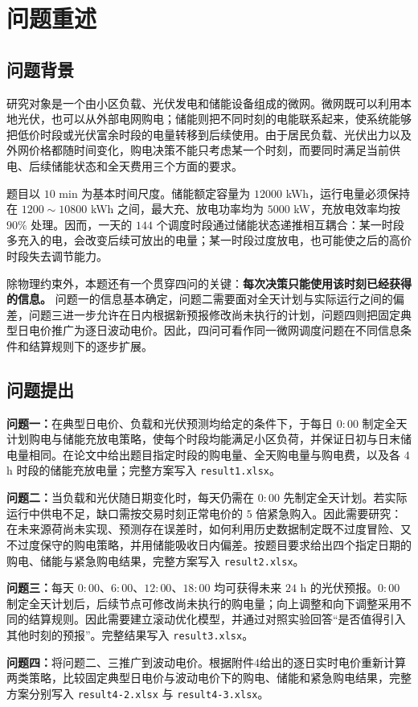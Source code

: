 \section{问题重述}

\subsection{问题背景}

研究对象是一个由小区负载、光伏发电和储能设备组成的微网。微网既可以利用本地光伏，也可以从外部电网购电；储能则把不同时刻的电能联系起来，使系统能够把低价时段或光伏富余时段的电量转移到后续使用。由于居民负载、光伏出力以及外网价格都随时间变化，购电决策不能只考虑某一个时刻，而要同时满足当前供电、后续储能状态和全天费用三个方面的要求。

题目以 $10$ min 为基本时间尺度。储能额定容量为 $12000$ kWh，运行电量必须保持在 $1200\sim10800$ kWh 之间，最大充、放电功率均为 $5000$ kW，充放电效率均按 $90\%$ 处理。因而，一天的 $144$ 个调度时段通过储能状态递推相互耦合：某一时段多充入的电，会改变后续可放出的电量；某一时段过度放电，也可能使之后的高价时段失去调节能力。

除物理约束外，本题还有一个贯穿四问的关键：\textbf{每次决策只能使用该时刻已经获得的信息。} 问题一的信息基本确定，问题二需要面对全天计划与实际运行之间的偏差，问题三进一步允许在日内根据新预报修改尚未执行的计划，问题四则把固定典型日电价推广为逐日波动电价。因此，四问可看作同一微网调度问题在不同信息条件和结算规则下的逐步扩展。

\subsection{问题提出}

\indent\textbf{问题一：}在典型日电价、负载和光伏预测均给定的条件下，于每日 $0{:}00$ 制定全天计划购电与储能充放电策略，使每个时段均能满足小区负荷，并保证日初与日末储电量相同。在论文中给出题目指定时段的购电量、全天购电量与购电费，以及各 $4$ h 时段的储能充放电量；完整方案写入 \texttt{result1.xlsx}。

\indent\textbf{问题二：}当负载和光伏随日期变化时，每天仍需在 $0{:}00$ 先制定全天计划。若实际运行中供电不足，缺口需按交易时刻正常电价的 $5$ 倍紧急购入。因此需要研究：在未来源荷尚未实现、预测存在误差时，如何利用历史数据制定既不过度冒险、又不过度保守的购电策略，并用储能吸收日内偏差。按题目要求给出四个指定日期的购电、储能与紧急购电结果，完整方案写入 \texttt{result2.xlsx}。

\indent\textbf{问题三：}每天 $0{:}00$、$6{:}00$、$12{:}00$、$18{:}00$ 均可获得未来 $24$ h 的光伏预报。$0{:}00$ 制定全天计划后，后续节点可修改尚未执行的购电量；向上调整和向下调整采用不同的结算规则。因此需要建立滚动优化模型，并通过对照实验回答“是否值得引入其他时刻的预报”。完整结果写入 \texttt{result3.xlsx}。

\indent\textbf{问题四：}将问题二、三推广到波动电价。根据附件4给出的逐日实时电价重新计算两类策略，比较固定典型日电价与波动电价下的购电、储能和紧急购电结果，完整方案分别写入 \texttt{result4-2.xlsx} 与 \texttt{result4-3.xlsx}。
